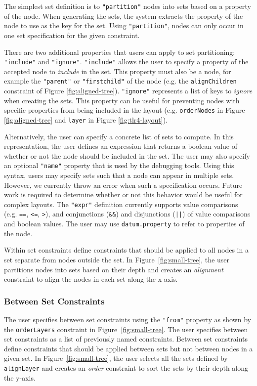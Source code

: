 The simplest set definition is to \texttt{"partition"} nodes into sets based on a property of the node. When generating the sets, the system extracts the property of the node to use as the key for the set. Using \texttt{"partition"}, nodes can only occur in one set specification for the given constraint.

There are two additional properties that users can apply to set partitioning: \texttt{"include"} and \texttt{"ignore"}. \texttt{"include"} allows the user to specify a property of the accepted node to \emph{include} in the set. This property must also be a node, for example the \texttt{"parent"} or \texttt{"firstchild"} of the node (e.g. the \texttt{alignChildren} constraint of Figure \ref{fig:aligned-tree}). \texttt{"ignore"} represents a list of keys to \emph{ignore} when creating the sets. This property can be useful for preventing nodes with specific properties from being included in the layout (e.g. \texttt{orderNodes} in Figure \ref{fig:aligned-tree} and \texttt{layer} in Figure \ref{fig:tlr4-layout}).

Alternatively, the user can specify a concrete list of sets to compute. In this representation, the user defines an expression that returns a boolean value of whether or not the node should be included in the set. The user may also specify an optional \texttt{"name"} property that is used by the debugging tools. Using this syntax, users may specify sets such that a node can appear in multiple sets. However, we currently throw an error when such a specification occurs. Future work is required to determine whether or not this behavior would be useful for complex layouts. The \texttt{"expr"} definition currently supports value comparisons (e.g. \texttt{==}, \texttt{<=}, \texttt{>}), and conjunctions (\texttt{\&\&}) and disjunctions (\texttt{||}) of value comparisons and boolean values. The user may use \texttt{datum.property} to refer to properties of the node.

Within set constraints define constraints that should be applied to all nodes in a set separate from nodes outside the set. In Figure~\ref{fig:small-tree}, the user partitions nodes into sets based on their depth and creates an \emph{alignment} constraint to align the nodes in each set along the x-axis.

\subsubsection{Between Set Constraints}
The user specifies between set constraints using the \texttt{"from"} property as shown by the \texttt{orderLayers} constraint in Figure~\ref{fig:small-tree}. The user specifies between set constraints as a list of previously named constraints. Between set constraints define constraints that should be applied between sets but not between nodes in a given set. In Figure~\ref{fig:small-tree}, the user selects all the sets defined by \texttt{alignLayer} and creates an \emph{order} constraint to sort the sets by their depth along the y-axis.

